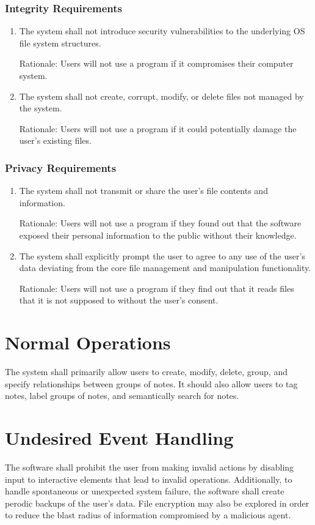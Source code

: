 \documentclass{article}
\begin{document}
\subsubsection{Integrity Requirements}
\begin{enumerate}[{I}NT1]
\item The system shall not introduce security vulnerabilities to the underlying OS file system structures.

Rationale: Users will not use a program if it compromises their computer system.
\item The system shall not create, corrupt, modify, or delete files not managed by the system.

Rationale: Users will not use a program if it could potentially damage the user's existing files.
\end{enumerate}

\subsubsection{Privacy Requirements}
\begin{enumerate}[PR{I}1]
\item The system shall not transmit or share the user's file contents and information.

Rationale: Users will not use a program if they found out that the software exposed their personal information to the public without their knowledge.
\item The system shall explicitly prompt the user to agree to any use of the user's data deviating from the core file management and manipulation functionality.

Rationale: Users will not use a program if they find out that it reads files that it is not supposed to without the user's consent.
\end{enumerate}

\section{Normal Operations}
The system shall primarily allow users to create, modify, delete, group, and specify relationships between groups of notes. It should also allow users to tag notes, label groups of notes, and semantically search for notes.

\section{Undesired Event Handling}
The software shall prohibit the user from making invalid actions by disabling input to interactive elements that lead to invalid operations. Additionally, to handle spontaneous or unexpected system failure, the software shall create perodic backups of the user's data. File encryption may also be explored in order to reduce the blast radius of information compromised by a malicious agent.
\end{document}
